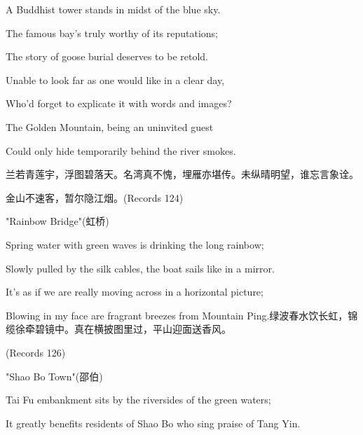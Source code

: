 A Buddhist tower stands in midst of the blue sky.

The famous bay's truly worthy of its reputations;

The story of goose burial deserves to be retold.

Unable to look far as one would like in a clear day,

Who'd forget to explicate it with words and images?

The Golden Mountain, being an uninvited guest

Could only hide temporarily behind the river smokes.


\begin{BookQuote}
兰若青莲宇，浮图碧落天。名湾真不愧，埋雁亦堪传。未纵晴明望，谁忘言象诠。
\end{BookQuote}

\begin{BookQuote}
金山不速客，暂尔隐江烟。(Records 124)
\end{BookQuote}

"Rainbow Bridge"(虹桥)

\begin{BookQuote}
Spring water with green waves is drinking the long rainbow;
\end{BookQuote}

\begin{BookQuote}
Slowly pulled by the silk cables, the boat sails like in a mirror.
\end{BookQuote}

\begin{BookQuote}
It's as if we are really moving across in a horizontal picture;
\end{BookQuote}

\begin{BookQuote}
Blowing in my face are fragrant breezes from Mountain Ping.绿波春水饮长虹，锦缆徐牵碧镜中。真在横披图里过，平山迎面送香风。
\end{BookQuote}

(Records 126)

"Shao Bo Town"(邵伯)

\begin{BookQuote}
Tai Fu embankment sits by the riversides of the green waters;
\end{BookQuote}

\begin{BookQuote}
It greatly benefits residents of Shao Bo who sing praise of Tang Yin.
\end{BookQuote}

